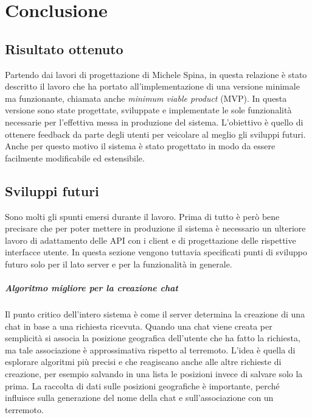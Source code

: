 \chapter{Conclusione}
\label{ch:concl}

\section{Risultato ottenuto}

Partendo dai lavori di progettazione di Michele Spina, in questa relazione è stato descritto il lavoro che ha portato all'implementazione di una versione minimale ma funzionante, chiamata anche \textit{minimum viable product } (MVP). In questa versione sono state progettate, sviluppate e implementate le sole funzionalità necessarie per l'effettiva messa in produzione del sistema. L'obiettivo è quello di ottenere feedback da parte degli utenti per veicolare al meglio gli sviluppi futuri. Anche per questo motivo il sistema è stato progettato in modo da essere facilmente modificabile ed estensibile.

\section{Sviluppi futuri}

Sono molti gli spunti emersi durante il lavoro. Prima di tutto è però bene precisare che per poter mettere in produzione il sistema è necessario un ulteriore lavoro di adattamento delle API con i client e di progettazione delle rispettive interfacce utente. In questa sezione vengono tuttavia specificati punti di sviluppo futuro solo per il lato server e per la funzionalità in generale.

\paragraph{Algoritmo migliore per la creazione chat} Il punto critico dell'intero sistema è come il server determina la creazione di una chat in base a una richiesta ricevuta. Quando una chat viene creata per semplicità si associa la posizione geografica dell'utente che ha fatto la richiesta, ma tale associazione è approssimativa rispetto al terremoto. L'idea è quella di esplorare algoritmi più precisi e che reagiscano anche alle altre richieste di creazione, per esempio salvando in una lista le posizioni invece di salvare solo la prima. La raccolta di dati sulle posizioni geografiche è importante, perché influisce sulla generazione del nome della chat e sull'associazione con un terremoto.

